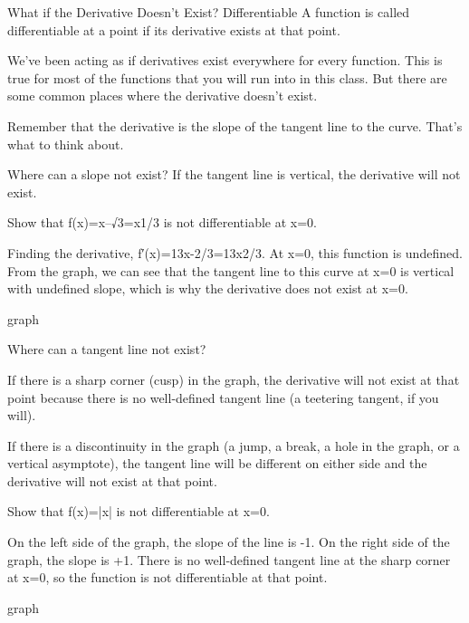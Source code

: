 What if the Derivative Doesn’t Exist?
Differentiable
A function is called differentiable at a point if its derivative exists at that point.

We’ve been acting as if derivatives exist everywhere for every function. This is true for most of the functions that you will run into in this class. But there are some common places where the derivative doesn’t exist.

Remember that the derivative is the slope of the tangent line to the curve. That’s what to think about.

Where can a slope not exist? If the tangent line is vertical, the derivative will not exist.

\begin{example}
Show that f(x)=x--√3=x1/3 is not differentiable at x=0.

\begin{solution} Finding the derivative, f′(x)=13x-2/3=13x2/3. At x=0, this function is undefined. From the graph, we can see that the tangent line to this curve at x=0 is vertical with undefined slope, which is why the derivative does not exist at x=0.

graph
\end{solution}\end{example}

Where can a tangent line not exist?

If there is a sharp corner (cusp) in the graph, the derivative will not exist at that point because there is no well-defined tangent line (a teetering tangent, if you will).

If there is a discontinuity in the graph (a jump, a break, a hole in the graph, or a vertical asymptote), the tangent line will be different on either side and the derivative will not exist at that point.

\begin{example}
Show that f(x)=|x| is not differentiable at x=0.

\begin{solution} On the left side of the graph, the slope of the line is -1. On the right side of the graph, the slope is +1. There is no well-defined tangent line at the sharp corner at x=0, so the function is not differentiable at that point.

graph
\end{solution}\end{example}
